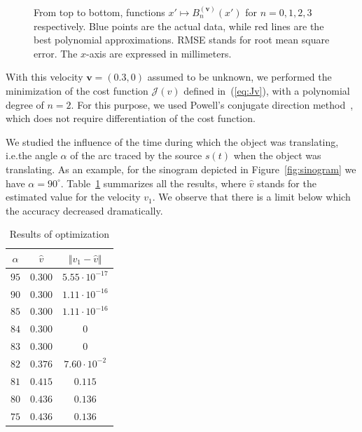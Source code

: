 \documentclass[twocolumn]{IEEEtran}
\newcommand{\ie}{i.e.}
\newcommand{\bv}{\mathbf{v}}
\newcommand{\Bnv}{B_n^{(\bv)}}
\begin{document}
\begin{figure}
\begin{tabular}{cc}
	\end{tabular}
	\caption{From top to bottom, functions $x' \mapsto \Bnv(x')$ for $n = 0,1,2,3$ respectively. Blue points are the actual data, while red lines are the best polynomial approximations. RMSE stands for root mean square error. The $x$-axis are expressed in millimeters.\label{fig:Bnx}}
\end{figure}

With this velocity $\bv = (0.3,0)$ assumed to be unknown, we performed the minimization of the cost function $\mathcal{J}(v)$ defined in~(\ref{eq:Jv}), with a polynomial degree of $n = 2$. For this purpose, we used Powell's conjugate direction method~\cite{powell1964efficient}, which does not require differentiation of the cost function.

We studied the influence of the time during which the object was translating, \ie the angle $\alpha$ of the arc traced by the source $s(t)$ when the object was translating. As an example, for the sinogram depicted in Figure~\ref{fig:sinogram} we have $\alpha = 90^{\circ}$. Table~\ref{tab:results} summarizes all the results, where $\hat{v}$ stands for the estimated value for the velocity $v_1$. We observe that there is a limit below which the accuracy decreased dramatically.

\begin{table}[!ht]
\caption{Results of optimization \label{tab:results}}
\centering
	\begin{tabular}{ccc}
	  $\alpha$ & $\hat{v}$ & $\Vert v_1 - \hat{v}\Vert$ \\
	  \hline
		$95$ & $0.30$0 & $5.55 \cdot 10^{-17}$ \\
		$90$ & $0.300$ & $1.11 \cdot 10^{-16}$ \\
		$85$ & $0.300$ & $1.11 \cdot 10^{-16}$ \\
		$84$ & $0.300$ & $0$ \\
		$83$ & $0.300$ & $0$ \\
		$82$ & $0.376$ & $7.60 \cdot 10^{-2}$ \\
		$81$ & $0.415$ & $0.115$ \\
		$80$ & $0.436$ & $0.136$ \\
		$75$ & $0.436$ & $0.136$
\end{tabular}
\end{table}
\end{document}
